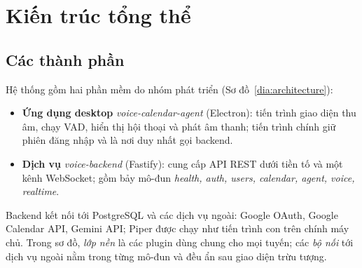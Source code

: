 \section{Kiến trúc tổng thể}\label{sec:architecture}
\subsection{Các thành phần}
Hệ thống gồm hai phần mềm do nhóm phát triển (Sơ đồ~\ref{dia:architecture}):
\begin{itemize}
  \item \textbf{Ứng dụng desktop} \textit{voice-calendar-agent} (Electron): tiến trình giao diện thu âm, chạy VAD, hiển thị hội thoại và phát âm thanh; tiến trình chính giữ phiên đăng nhập và là nơi duy nhất gọi backend.
  \item \textbf{Dịch vụ} \textit{voice-backend} (Fastify): cung cấp API REST dưới tiền tố  và một kênh WebSocket; gồm bảy mô-đun \textit{health, auth, users, calendar, agent, voice, realtime}.
\end{itemize}
Backend kết nối tới PostgreSQL và các dịch vụ ngoài: Google OAuth, Google Calendar API, Gemini API; Piper được chạy như tiến trình con trên chính máy chủ. Trong sơ đồ, \textit{lớp nền} là các plugin dùng chung cho mọi tuyến; các \textit{bộ nối} tới dịch vụ ngoài nằm trong từng mô-đun và đều ẩn sau giao diện trừu tượng.

